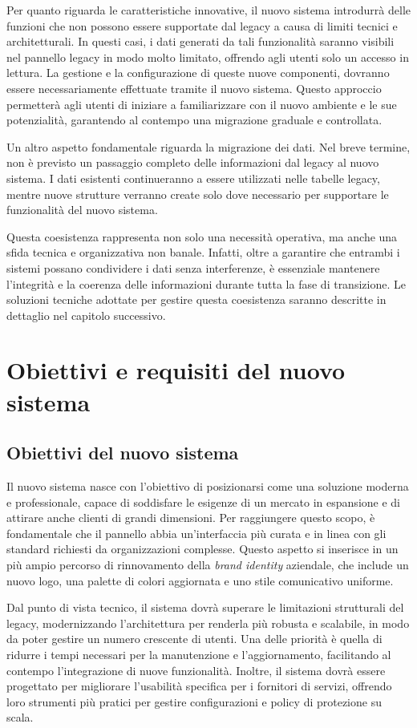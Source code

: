 Per quanto riguarda le caratteristiche innovative, il nuovo sistema introdurrà delle funzioni che non possono essere supportate dal legacy a causa di limiti tecnici e architetturali. In questi casi, i dati generati da tali funzionalità saranno visibili nel pannello legacy in modo molto limitato, offrendo agli utenti solo un accesso in lettura. La gestione e la configurazione di queste nuove componenti, dovranno essere necessariamente effettuate tramite il nuovo sistema. Questo approccio permetterà agli utenti di iniziare a familiarizzare con il nuovo ambiente e le sue potenzialità, garantendo al contempo una migrazione graduale e controllata.

Un altro aspetto fondamentale riguarda la migrazione dei dati. Nel breve termine, non è previsto un passaggio completo delle informazioni dal legacy al nuovo sistema. I dati esistenti continueranno a essere utilizzati nelle tabelle legacy, mentre nuove strutture verranno create solo dove necessario per supportare le funzionalità del nuovo sistema.

Questa coesistenza rappresenta non solo una necessità operativa, ma anche una sfida tecnica e organizzativa non banale. Infatti, oltre a garantire che entrambi i sistemi possano condividere i dati senza interferenze, è essenziale mantenere l’integrità e la coerenza delle informazioni durante tutta la fase di transizione. Le soluzioni tecniche adottate per gestire questa coesistenza saranno descritte in dettaglio nel capitolo successivo.

\section{Obiettivi e requisiti del nuovo sistema}
\subsection{Obiettivi del nuovo sistema}
Il nuovo sistema nasce con l'obiettivo di posizionarsi come una soluzione moderna e professionale, capace di soddisfare le esigenze di un mercato in espansione e di attirare anche clienti di grandi dimensioni. Per raggiungere questo scopo, è fondamentale che il pannello abbia un'interfaccia più curata e in linea con gli standard richiesti da organizzazioni complesse. Questo aspetto si inserisce in un più ampio percorso di rinnovamento della  \textit{brand identity} aziendale, che include un nuovo logo, una palette di colori aggiornata e uno stile comunicativo uniforme.

Dal punto di vista tecnico, il sistema dovrà superare le limitazioni strutturali del legacy, modernizzando l'architettura per renderla più robusta e scalabile, in modo da poter gestire un numero crescente di utenti. Una delle priorità è quella di ridurre i tempi necessari per la manutenzione e l’aggiornamento, facilitando al contempo l’integrazione di nuove funzionalità. Inoltre, il sistema dovrà essere progettato per migliorare l’usabilità specifica per i fornitori di servizi, offrendo loro strumenti più pratici per gestire configurazioni e policy di protezione su scala.

